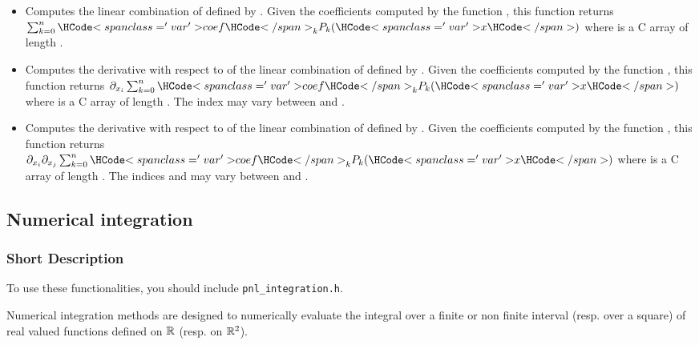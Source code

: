\begin{itemize}
\item {}
  \sshortdescribe Computes the linear combination of  defined by
  . Given the coefficients computed by the function
  , this function returns $\sum_{k=0}^n
  \var{coef}_k  P_k(\var{x})$ where  is a C array of length
  .

\item {}
  \sshortdescribe Computes the derivative with respect to  of the
  linear combination of  defined by . Given the
  coefficients computed by the function , this
  function returns $\partial_{x_i} \sum_{k=0}^n \var{coef}_k  P_k(\var{x})$
  where  is a C array of length . The index 
  may vary between  and .


\item {}
  \sshortdescribe Computes the derivative with respect to  of the
  linear combination of  defined by . Given the
  coefficients computed by the function , this
  function returns $\partial_{x_i} \partial_{x_j} \sum_{k=0}^n \var{coef}_k  P_k(\var{x})$
  where  is a C array of length . The indices 
  and  may vary between  and .
\end{itemize}


\subsection{Numerical integration}
\subsubsection{Short Description}

To use these functionalities, you should include \verb!pnl_integration.h!.

Numerical integration methods are designed to numerically evaluate the integral
over a finite or non finite interval (resp. over a square) of real valued
functions defined on ${\mathbb R}$ (resp. on ${\mathbb R}^2$).

